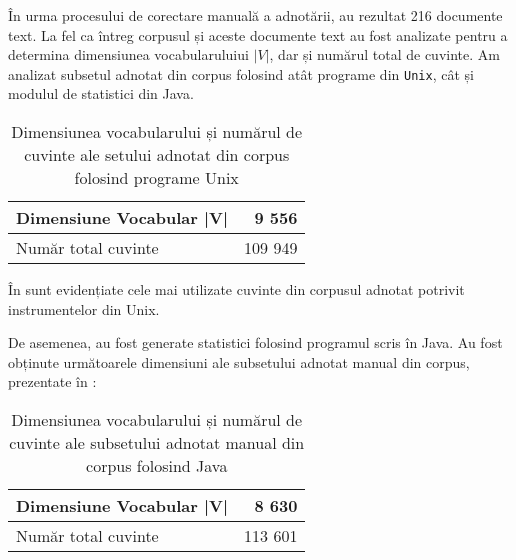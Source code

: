 În urma procesului de corectare manuală a adnotării, au rezultat 216 documente text. La fel ca întreg corpusul și aceste documente text au fost analizate pentru a determina dimensiunea vocabularuluiui $|V|$, dar și numărul total de cuvinte. Am analizat subsetul adnotat din corpus folosind atât programe din \texttt{Unix}, cât și modulul de statistici din Java.


\begin{center}
\begin{table}[htb]
  \caption{Dimensiunea vocabularului și numărul de cuvinte ale setului adnotat din corpus folosind programe Unix}
  \begin{tabular}{|l|r|}
    \hline
    Dimensiune Vocabular |V| & 9 556\\
    \hline
    Număr total cuvinte & 109 949 \\
     \hline
  \end{tabular}
  \label{table:annotated-corpus-vocab-size}
\end{table}
\end{center}

În  sunt evidențiate cele mai utilizate cuvinte din corpusul adnotat potrivit instrumentelor din Unix.

\lstset{language=make}
\lstset{caption=Cele mai folosite cuvinte din limba engleză pentru subsetul adnotat din corpus folosind programe Unix, label=lst:top-words-bash-annotated}


De asemenea, au fost generate statistici folosind programul scris în Java. Au fost obținute următoarele dimensiuni ale subsetului adnotat manual din corpus, prezentate în :

\begin{center}
\begin{table}[htb]
  \caption{Dimensiunea vocabularului și numărul de cuvinte ale subsetului adnotat manual din corpus folosind Java}
  \begin{tabular}{|l|r|}
    \hline
    Dimensiune Vocabular |V| & 8 630\\
    \hline
    Număr total cuvinte & 113 601 \\
     \hline
  \end{tabular}
  \label{table:vocabulary-size-java-annotated}
\end{table}
\end{center}

